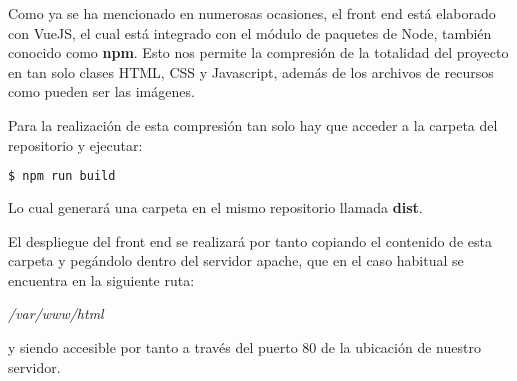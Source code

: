 Como ya se ha mencionado en numerosas ocasiones, el front end está elaborado con VueJS, el cual está integrado con el módulo de paquetes de Node, también conocido como \textbf{npm}.
Esto nos permite la compresión de la totalidad del proyecto en tan solo clases HTML, CSS y Javascript, además de los archivos de recursos como pueden ser las imágenes.

Para la realización de esta compresión tan solo hay que acceder a la carpeta del repositorio y ejecutar:

    \begin{lstlisting}[language=bash]
        $ npm run build
    \end{lstlisting}
    
    Lo cual generará una carpeta en el mismo repositorio llamada \textbf{dist}.
    
    El despliegue del front end se realizará por tanto copiando el contenido de esta carpeta y pegándolo dentro del servidor apache, que en el caso habitual se encuentra en la siguiente ruta:
    
    \textit{/var/www/html}
    
    y siendo accesible por tanto a través del puerto 80 de la ubicación de nuestro servidor.